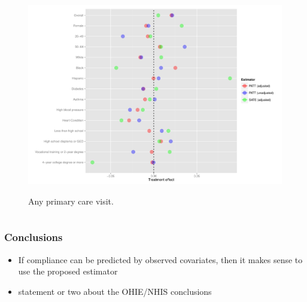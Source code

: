\documentclass{beamer}
\begin{document}
\begin{frame}
\begin{figure}[htbp]
\begin{center}
    \caption{Any primary care visit.}
   \includegraphics[scale=0.35]{../paper/any-out-plot.pdf} 
   \label{het-plot-ao}
   \end{center}
\end{figure}
\end{frame}



\section[Conclusions]{}

\begin{frame}
\frametitle{Conclusions}
\begin{itemize}
\item If compliance can be predicted by observed covariates, then it makes sense to use the proposed estimator 
\item statement or two about the OHIE/NHIS conclusions
\end{itemize}
\end{frame}

\section[References]{}

\begin{frame}
\begin{singlespace}
\begin{tiny}


\end{tiny}
\end{singlespace}
\itemize
\end{frame}
\end{document}
